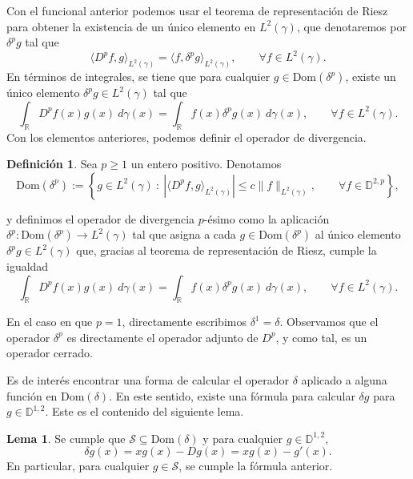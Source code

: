 \documentclass[letterpaper,twoside,12pt]{book}
\newcommand{\R}{\mathbb{R}}
\newcommand{\D}{\mathbb{D}}
\renewcommand{\S}{\mathcal{S}}
\newcommand{\1}{\mathds{1}}
\newcommand{\abs}[1]{\left\lvert #1 \right\rvert}
\theoremstyle{definition}
\newtheorem{dfn}{Definición}
\theoremstyle{definition}
\theoremstyle{remark}
\theoremstyle{definition}
\theoremstyle{definition}
\theoremstyle{definition}
\theoremstyle{definition}
\theoremstyle{definition}
\newtheorem{lema}{Lema}
\begin{document}
Con el funcional anterior podemos usar el teorema de representación de Riesz para obtener la existencia de un único elemento en $L^2(\gamma)$, que denotaremos por $\delta^{p}g$ tal que 
\[
\langle D^pf,g\rangle_{L^2(\gamma)}=\langle f,\delta^p g\rangle_{L^2(\gamma)}, \qquad \forall f\in L^2(\gamma).
\]
En términos de integrales, se tiene que para cualquier $g\in \text{Dom}(\delta^p)$, existe un único elemento $\delta^p g\in L^2(\gamma)$ tal que 
\[
 \int_\R D^{p}f(x) g(x) \ d\gamma(x)=\int_\R f(x)\delta^{p}g(x) \ d\gamma(x), \qquad \forall f\in L^2(\gamma).  
\]
Con los elementos anteriores, podemos definir el operador de divergencia.

\begin{dfn}
   Sea $p\geq1$ un entero positivo. Denotamos $$\text{Dom}(\delta^p):=\left\{g\in L^2(\gamma) \ : \ \abs{\langle D^{p}f,g\rangle_{L^2(\gamma)}}\leq c\|f\|_{L^2(\gamma)}, \qquad \forall f\in \D^{2,p}\right\},$$ 

   y definimos el operador de divergencia $p$-ésimo como la aplicación $\delta^p:\text{Dom}(\delta^{p})\longrightarrow L^2(\gamma)$ tal que asigna a cada $g\in \text{Dom}(\delta^{p})$ al único elemento $\delta^{p} g\in L^2(\gamma)$ que, gracias al teorema de representación de Riesz, cumple la igualdad
       \[
       \int_\R D^{p}f(x)g(x) \ d\gamma(x)=\int_\R f(x)\delta^{p}g(x) \ d\gamma(x), \qquad \forall f\in L^2(\gamma).
      \]
\end{dfn}
En el caso en que $p=1$, directamente escribimos $\delta^1=\delta$. Observamos que el operador $\delta^p$ es directamente el operador adjunto de $D^{p}$, y como tal, es un operador cerrado.

Es de interés encontrar una forma de calcular el operador $\delta$ aplicado a alguna función en $\text{Dom}(\delta)$. En este sentido, existe una fórmula para calcular $\delta g$ para $g\in \D^{1,2}$. Este es el contenido del siguiente lema.

\begin{lema}\label{formuladelta}
   Se cumple que $\S\subseteq \text{Dom}(\delta)$ y para cualquier $g\in \D^{1,2}$, 
   \[
      \delta g(x)=xg(x)-Dg(x)=xg(x)-g'(x).
   \]
 En particular, para cualquier $g\in \S$, se cumple la fórmula anterior.
 \end{lema}
\end{document}
